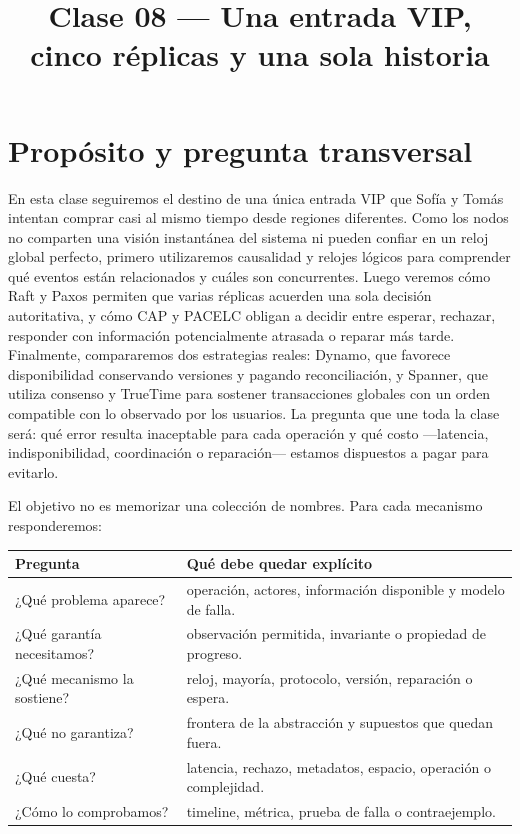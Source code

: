 \documentclass[variant=apuntes,cover=institutional,mode=screen]{ua-engineering-v6-article}
\title{Clase 08 --- Una entrada VIP, cinco réplicas y una sola historia}
\author{\UAProfessor}
\date{\UADate}
\begin{document}
\maketitle

\section{Propósito y pregunta transversal}

En esta clase seguiremos el destino de una única entrada VIP que Sofía y Tomás intentan comprar casi al mismo tiempo desde regiones diferentes. Como los nodos no comparten una visión instantánea del sistema ni pueden confiar en un reloj global perfecto, primero utilizaremos causalidad y relojes lógicos para comprender qué eventos están relacionados y cuáles son concurrentes. Luego veremos cómo Raft y Paxos permiten que varias réplicas acuerden una sola decisión autoritativa, y cómo CAP y PACELC obligan a decidir entre esperar, rechazar, responder con información potencialmente atrasada o reparar más tarde. Finalmente, compararemos dos estrategias reales: Dynamo, que favorece disponibilidad conservando versiones y pagando reconciliación, y Spanner, que utiliza consenso y TrueTime para sostener transacciones globales con un orden compatible con lo observado por los usuarios. La pregunta que une toda la clase será: qué error resulta inaceptable para cada operación y qué costo ---latencia, indisponibilidad, coordinación o reparación--- estamos dispuestos a pagar para evitarlo.

El objetivo no es memorizar una colección de nombres. Para cada mecanismo responderemos:

\begin{center}
\begin{tabular}{p{}p{}}
\toprule
\textbf{Pregunta} & \textbf{Qué debe quedar explícito}\\
\midrule
¿Qué problema aparece? & operación, actores, información disponible y modelo de falla.\\
¿Qué garantía necesitamos? & observación permitida, invariante o propiedad de progreso.\\
¿Qué mecanismo la sostiene? & reloj, mayoría, protocolo, versión, reparación o espera.\\
¿Qué no garantiza? & frontera de la abstracción y supuestos que quedan fuera.\\
¿Qué cuesta? & latencia, rechazo, metadatos, espacio, operación o complejidad.\\
¿Cómo lo comprobamos? & timeline, métrica, prueba de falla o contraejemplo.\\
\bottomrule
\end{tabular}
\end{center}
\end{document}
